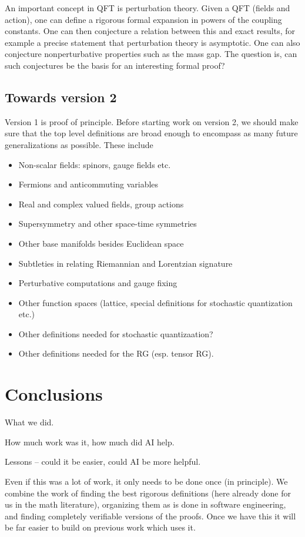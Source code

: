\documentclass{article}
\newcommand{\1}{\mathbbm{1}}
\theoremstyle{plain}
\theoremstyle{definition}
\numberwithin{equation}{section}
\begin{document}
An important concept in QFT is perturbation theory.  Given a QFT (fields and action), one can define a rigorous formal expansion
in powers of the coupling constants.  One can then conjecture a relation between this and exact results, for example a precise statement
that perturbation theory is asymptotic.  One can also conjecture nonperturbative properties such as the mass gap.  The question is, can such
conjectures be the basis for an interesting formal proof?

\subsection{Towards version 2}

Version 1 is proof of principle.  Before starting work on version 2, we should make sure that the top level definitions are broad enough to encompass as many future generalizations as possible.
These include
\begin{itemize}
    \item Non-scalar fields: spinors, gauge fields etc.
    \item Fermions and anticommuting variables
    \item Real and complex valued fields, group actions
    \item Supersymmetry and other space-time symmetries
    \item Other base manifolds besides Euclidean space
    \item Subtleties in relating Riemannian and Lorentzian signature
    \item Perturbative computations and gauge fixing
    \item Other function spaces (lattice, special definitions for stochastic quantization etc.)
    \item Other definitions needed for stochastic quantizaation?
    \item Other definitions needed for the RG (esp. tensor RG).
\end{itemize}

\section{Conclusions}

What we did.

How much work was it, how much did AI help.

Lessons -- could it be easier, could AI be more helpful.

Even if this was a lot of work, it only needs to be done once (in principle).  We combine the work of finding the best
rigorous definitions (here already done for us in the math literature), organizing them as is done in software engineering,
and finding completely verifiable versions of the proofs.  Once we have this it will be far easier to build on previous work
which uses it.
\end{document}
